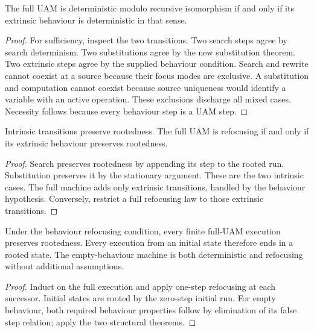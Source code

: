 \begin{theorem}
The full UAM is deterministic modulo recursive isomorphism if and only if its
extrinsic behaviour is deterministic in that sense.
\end{theorem}
\begin{proof}
For sufficiency, inspect the two transitions. Two search steps agree by search
determinism. Two substitutions agree by the new substitution theorem. Two
extrinsic steps agree by the supplied behaviour condition. Search and rewrite
cannot coexist at a source because their focus modes are exclusive. A
substitution and computation cannot coexist because source uniqueness would
identify a variable with an active operation. These exclusions discharge all
mixed cases. Necessity follows because every behaviour step is a UAM step.
\end{proof}


\begin{theorem}
Intrinsic transitions preserve rootedness. The full UAM is refocusing if and
only if its extrinsic behaviour preserves rootedness.
\end{theorem}
\begin{proof}
Search preserves rootedness by appending its step to the rooted run.
Substitution preserves it by the stationary argument. These are the two
intrinsic cases. The full machine adds only extrinsic transitions, handled
by the behaviour hypothesis. Conversely, restrict a full refocusing law to
those extrinsic transitions.
\end{proof}


\begin{corollary}
Under the behaviour refocusing condition, every finite full-UAM execution
preserves rootedness. Every execution from an initial state therefore ends
in a rooted state. The empty-behaviour machine is both deterministic and
refocusing without additional assumptions.
\end{corollary}
\begin{proof}
Induct on the full execution and apply one-step refocusing at each successor.
Initial states are rooted by the zero-step initial run. For empty behaviour,
both required behaviour properties follow by elimination of its false step
relation; apply the two structural theorems.
\end{proof}


